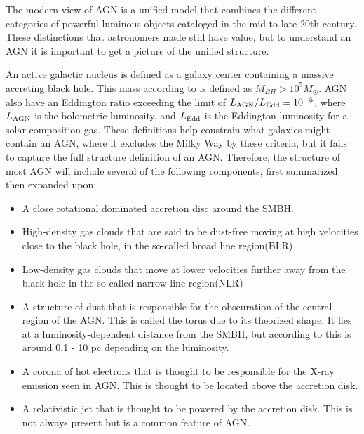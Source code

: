 The modern view of AGN is a unified model that combines the different categories of powerful luminous objects cataloged in the mid to late 20th century. 
These distinctions that astronomers made still
have value, but to understand an AGN it is important to get a picture of the unified structure.

An active galactic nucleus is defined as a galaxy center containing a massive accreting black hole. This mass according to \cite{Netzer_2015} 
is defined as $M_{BH} > 10^5 M_\odot$. AGN also have an Eddington ratio exceeding
the limit of $L_{\rm AGN}/ L_{\rm Edd} = 10^{-5}$, where $L_{\rm AGN}$ is the bolometric luminosity, and $L_{\rm Edd}$ is the Eddington luminosity for a solar 
composition gas. These definitions help constrain what galaxies might contain an AGN, where it excludes the Milky Way 
by these criteria, but it fails to capture the full structure definition of an AGN. 
Therefore, the structure of most AGN will include several of the following components, first summarized then expanded upon: 


\begin{itemize}
    \item A close rotational dominated accretion disc around the SMBH. %
   \item High-density gas clouds that are said to be dust-free moving at high velocities close to the black hole, in the so-called broad line region(BLR)
    \item Low-density gas clouds that move at lower velocities further away from the black hole in the so-called narrow line region(NLR)
    \item A structure of dust that is responsible for the obscuration of the central region of the AGN. This is called the torus due to its theorized shape. 
     It lies at a luminosity-dependent distance from the SMBH, but according to \cite{Netzer_2015} this is around 0.1 - 10 pc depending on the luminosity.
    \item A corona of hot electrons that is thought to be responsible for the X-ray emission seen in AGN. This is thought to be located above the accretion disk. 
    \item A relativistic jet that is thought to be powered by the accretion disk. This is not always present but is a common feature of AGN.
\end{itemize}

